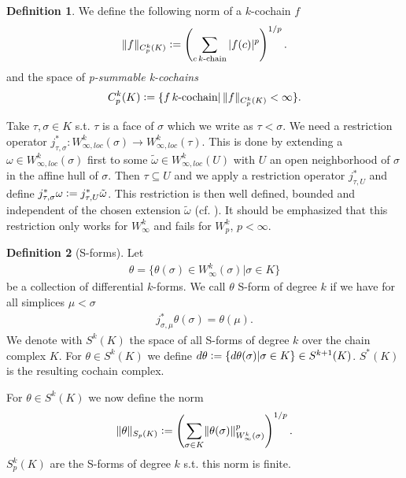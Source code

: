 \documentclass[12pt,a4paper]{article}
\theoremstyle{definition}
\newtheorem{definition}{Definition}
\newcommand{\norm}[2]{\lVert #1 \rVert_{#2}}
\begin{document}
\begin{definition}
    We define the following norm of a $k$-cochain $f$
    \begin{align*}
    \norm{f}{C_p^k(K)} \vcentcolon= 
    \left( \sum\limits_{c \, k\text{-chain}} |f(c)|^p \right)^{1/p}.
    \end{align*}
    and the space of \textit{p-summable k-cochains}
    \begin{align*}
    C_p^k(K) \vcentcolon= \{f \, k\text{-cochain} | \,  
    \norm{f}{C_p^k(K)} < \infty \}.
    \end{align*}
\end{definition}
Take $\tau, \sigma \in K$ s.t. $\tau$ is a face of $\sigma$ which we write as
$\tau < \sigma$. We need a restriction operator 
$j^*_{\tau,\sigma}:W_{\infty,loc}^k(\sigma) \rightarrow W_{\infty,loc}^k(\tau)$.
This is done by extending a $\omega \in W_{\infty,loc}^k(\sigma)$ first 
to some $\tilde{\omega}\in W_{\infty,loc}^k(U)$ with 
$U$ an open neighborhood of $\sigma$ in the affine hull of $\sigma$. Then 
$\tau \subseteq U$ and we apply a restriction operator $j^*_{\tau,U}$
and define $j^*_{\tau,\sigma} \omega \vcentcolon= j^*_{\tau,U}\tilde{\omega}$. 
This restriction is then well defined, bounded and independent of the chosen 
extension $\tilde{\omega}$ (cf. \cite[p.191]{goldshtein}). It should be 
emphasized that this restriction only works for $W^k_\infty$ and fails for 
$W^k_p$, $p<\infty$. 

\begin{definition}[S-forms]
    Let 
    \begin{align*}
    \theta = \{ \theta(\sigma) \in W^k_\infty(\sigma) | \sigma \in K\}
    \end{align*}
    be a collection of differential $k$-forms. We call $\theta$ S-form of degree
    $k$ if we have for all simplices
    $\mu <\sigma$ 
    \begin{align*}
    j^*_{\sigma,\mu}\theta(\sigma) = \theta(\mu).
    \end{align*}
    We denote with $S^k(K)$ the space of all S-forms of degree $k$ 
    over the chain complex $K$. 
    For $\theta \in S^k(K)$ we define $d\theta \vcentcolon= \{ d\theta(\sigma) | 
    \sigma \in K \} \in S^{k+1}(K)$. $S^*(K)$ is the resulting cochain complex.
\end{definition}
For $\theta \in S^k(K)$ we now define the norm
\begin{align*}
\lVert \theta \rVert _{S_p(K)}  \vcentcolon= \left( \sum_{\sigma \in K} 
\lVert \theta(\sigma) \rVert _{W^k_\infty(\sigma)}^p \right)^{1/p}.
\end{align*} 
$S^k_p(K)$ are the S-forms of degree $k$ s.t. this norm is finite.
\end{document}
